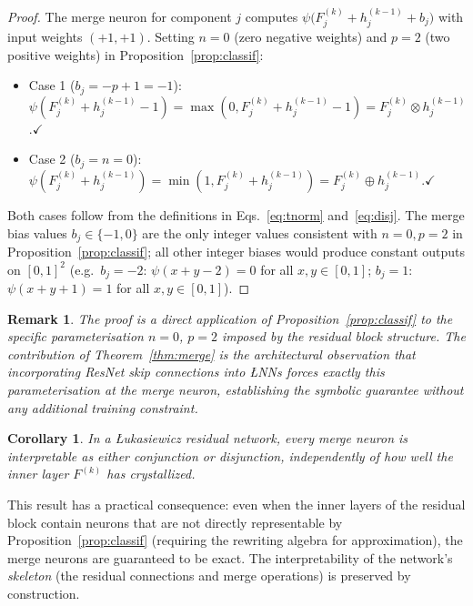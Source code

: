 \documentclass[lettersize,journal]{IEEEtran}
\newtheorem{corollary}[theorem]{Corollary}
\newtheorem{remark}[theorem]{Remark}
\newcommand{\tnorm}{\otimes}      %
\newcommand{\disj}{\oplus}        %
\newcommand{\LNN}{\L{}NN}
\begin{document}
\begin{proof}
The merge neuron for component $j$ computes
$\psi\bigl(F^{(k)}_j + h^{(k-1)}_j + b_j\bigr)$
with input weights $(+1, +1)$.
Setting $n = 0$ (zero negative weights) and $p = 2$ (two positive weights)
in Proposition~\ref{prop:classif}:
\begin{itemize}
  \item Case 1 ($b_j = -p + 1 = -1$):
    $\psi(F^{(k)}_j + h^{(k-1)}_j - 1)
     = \max(0, F^{(k)}_j + h^{(k-1)}_j - 1)
     = F^{(k)}_j \tnorm h^{(k-1)}_j$.\quad$\checkmark$
  \item Case 2 ($b_j = n = 0$):
    $\psi(F^{(k)}_j + h^{(k-1)}_j)
     = \min(1, F^{(k)}_j + h^{(k-1)}_j)
     = F^{(k)}_j \disj h^{(k-1)}_j$.\quad$\checkmark$
\end{itemize}
Both cases follow from the definitions in Eqs.~\eqref{eq:tnorm}
and~\eqref{eq:disj}.
The merge bias values $b_j \in \{-1, 0\}$ are the only integer values
consistent with $n=0, p=2$ in Proposition~\ref{prop:classif};
all other integer biases would produce constant outputs on $[0,1]^2$
(e.g.\ $b_j = -2$: $\psi(x+y-2) = 0$ for all $x,y \in [0,1]$;
$b_j = 1$: $\psi(x+y+1) = 1$ for all $x,y \in [0,1]$).
\end{proof}

\begin{remark}
The proof is a direct application of Proposition~\ref{prop:classif} to the
specific parameterisation $n=0$, $p=2$ imposed by the residual block
structure.
The contribution of Theorem~\ref{thm:merge} is the architectural observation
that incorporating ResNet skip connections into \LNN{}s forces exactly this
parameterisation at the merge neuron, establishing the symbolic guarantee
without any additional training constraint.
\end{remark}


\begin{corollary}
In a \L{}ukasiewicz residual network, every merge neuron is
interpretable as either conjunction or disjunction, independently of
how well the inner layer $F^{(k)}$ has crystallized.
\end{corollary}

This result has a practical consequence: even when the inner layers of the
residual block contain neurons that are not directly representable by
Proposition~\ref{prop:classif} (requiring the rewriting algebra for
approximation), the merge neurons are guaranteed to be exact.
The interpretability of the network's \emph{skeleton} (the residual connections
and merge operations) is preserved by construction.
\end{document}
